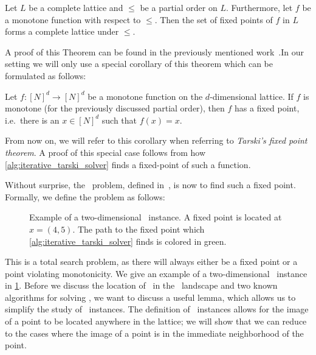 \begin{theorem}
	Let $L$ be a complete lattice and $\leq$ be a partial order on $L$. Furthermore, let $f$ be a monotone function with respect to $\leq$. Then the set of fixed points of $f$ in $L$ forms a complete lattice under $\leq$.
\end{theorem}

A proof of this Theorem can be found in the previously mentioned work~\cite{tarski_lattice-theoretical_1955}.In our setting we will only use a special corollary of this theorem which can be formulated as follows:

\begin{corollary}
	Let $f : {[N]}^d \rightarrow {[N]}^d$ be a monotone function on the $d$-dimensional lattice. If $f$ is monotone (for the previously discussed partial order), then $f$ has a fixed point, i.e.\ there is an $x \in {[N]}^d$ such that $f(x)=x$.
\end{corollary}

From now on, we will refer to this corollary when referring to \emph{Tarski's fixed point theorem}. A proof of this special case follows from how \cref{alg:iterative_tarski_solver} finds a fixed-point of such a function.

Without surprise, the \Tarski\ problem, defined in~, is now to find such a fixed point. Formally, we define the problem as follows:

\begin{figure}
	\centering
	\caption[Example of a \Tarski\ instance]{Example of a two-dimensional \Tarski\ instance. A fixed point is located at $x = (4, 5)$. The path to the fixed point which \cref{alg:iterative_tarski_solver} finds is colored in green.}\label{fig:tarski_example}
\end{figure}

This is a total search problem, as there will always either be a fixed point or a point violating monotonicity. We give an example of a two-dimensional \Tarski\ instance in \cref{fig:tarski_example}. Before we discuss the location of \Tarski\ in the \TFNP\ landscape and two known algorithms for solving \Tarski, we want to discuss a useful lemma, which allows us to simplify the study of \Tarski\ instances. The definition of \Tarski\ instances allows for the image of a point to be located anywhere in the lattice; we will show that we can reduce to the cases where the image of a point is in the immediate neighborhood of the point.

